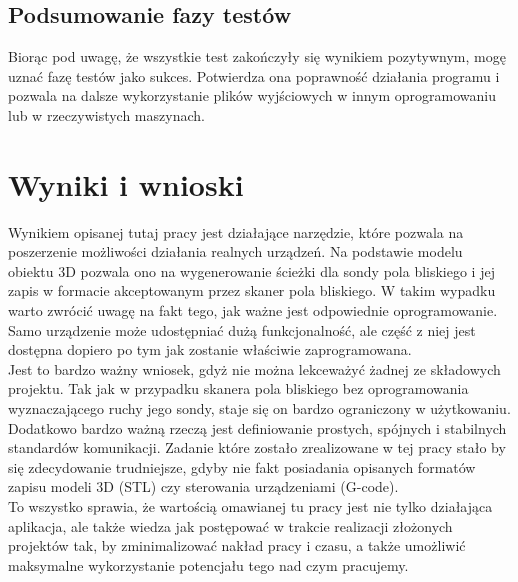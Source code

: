 \documentclass[a4paper,12pt,twoside,openany]{report}
\begin{document}
  \section{Podsumowanie fazy testów}
    Biorąc pod uwagę, że wszystkie test zakończyły się wynikiem pozytywnym, mogę uznać fazę testów jako sukces. Potwierdza ona poprawność działania programu i pozwala na 
    dalsze wykorzystanie plików wyjściowych w innym oprogramowaniu lub w rzeczywistych maszynach.

\chapter{Wyniki i wnioski}
    Wynikiem opisanej tutaj pracy jest działające narzędzie, które pozwala na poszerzenie możliwości działania realnych urządzeń. Na podstawie modelu 
    obiektu 3D pozwala ono na wygenerowanie ścieżki dla sondy pola bliskiego i jej zapis w formacie akceptowanym przez skaner pola bliskiego. 
    W takim wypadku warto zwrócić uwagę na fakt tego, jak ważne jest odpowiednie oprogramowanie. Samo urządzenie może udostępniać dużą funkcjonalność, 
    ale część z niej jest dostępna dopiero po tym jak zostanie właściwie zaprogramowana.\\
    Jest to bardzo ważny wniosek, gdyż nie można lekceważyć żadnej ze składowych projektu. Tak jak w przypadku skanera pola bliskiego bez oprogramowania 
    wyznaczającego ruchy jego sondy, staje się on bardzo ograniczony w użytkowaniu. Dodatkowo bardzo ważną rzeczą jest definiowanie prostych, spójnych i 
    stabilnych standardów komunikacji. Zadanie które zostało zrealizowane w tej pracy stało by się zdecydowanie trudniejsze, gdyby nie fakt posiadania opisanych
    formatów zapisu modeli 3D (STL) czy sterowania urządzeniami (G-code).\\
    To wszystko sprawia, że wartością omawianej tu pracy jest nie tylko działająca aplikacja, ale także wiedza jak postępować w trakcie realizacji złożonych projektów 
    tak, by zminimalizować nakład pracy i czasu, a także umożliwić maksymalne wykorzystanie potencjału tego nad czym pracujemy.














































\begin{thebibliography}{99}

\end{thebibliography}
\end{document}
